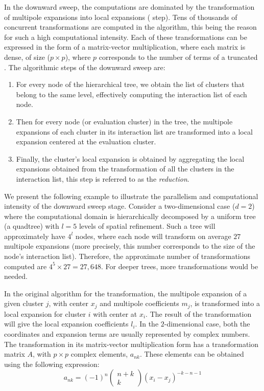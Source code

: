 In the downward sweep, the computations are dominated by the transformation of multipole expansions into local expansions ({\ML} step). Tens of thousands of concurrent {\ML} transformations are computed in the {\fmm} algorithm, this being the reason for such a high computational intensity. Each of these transformations can be expressed in the form of a matrix-vector multiplication, where each matrix is dense, of size ($p \times p$), where $p$ corresponds to the number of terms of a truncated {\ME}. 
The algorithmic steps of the downward sweep are: 
\begin{enumerate}
\item For every node of the hierarchical tree, we obtain the list of clusters that belong to the same level, effectively computing the interaction list of each node. 
\item Then for every node (or evaluation cluster) in the tree, the multipole expansions of each cluster in its interaction list are transformed into a local expansion centered at the evaluation cluster.
\item Finally, the cluster's local expansion is obtained by aggregating the local expansions obtained from the {\ML} transformation of all the clusters in the interaction list, this step is referred to as the \emph{reduction}.
\end{enumerate}

We present the following example to illustrate the parallelism and computational intensity of the downward sweep stage. Consider a two-dimensional case ($d = 2$) where the computational domain is hierarchically decomposed by a uniform tree (a quadtree) with $l=5$ levels of spatial refinement. Such a tree will approximately have $4^{l}$ nodes, where each node will transform on average $27$ multipole expansions (more precisely, this number corresponds to the size of the node's interaction list). Therefore, the approximate number of {\ML} transformations computed are $4^{5} \times 27 = 27,648$. For deeper trees, more transformations would be needed. 

In the original algorithm for the {\ML} transformation, the multipole expansion of a given cluster $j$, with center $x_j$ and multipole coefficients $m_j$, is transformed into a local expansion for cluster $i$ with center at $x_i$. The result of the transformation will give the local expansion coefficients $l_i$. In the $2$-dimensional case, both the coordinates and expansion terms are usually represented by complex numbers. The {\ML} transformation in its matrix-vector multiplication form has a transformation matrix $A$, with $p\times p$ complex elements, $a_{nk}$. These elements can be obtained using the following expression:
\begin{equation}\label{eq:M2Lmat}
a_{nk} = (-1)^{n} \left(
\begin{array}{c}
  n+k      \\
   k   
\end{array}
\right)
{\left( x_{i} - x_{j} \right)}^{-k-n-1}
\end{equation} 

